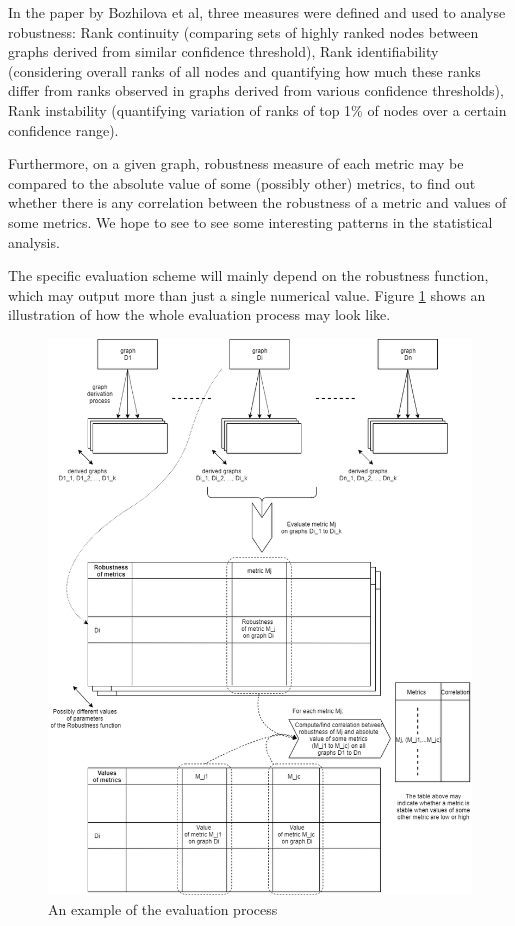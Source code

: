 \documentclass[12pt,a4paper,twoside]{article}
\begin{document}
    	In the paper by Bozhilova et al, three measures were defined and used to analyse robustness: Rank continuity (comparing sets of highly ranked nodes between graphs derived from similar confidence threshold), Rank identifiability (considering overall ranks of all nodes and quantifying how much these ranks differ from ranks observed in graphs derived from various confidence thresholds), Rank instability (quantifying variation of ranks of top 1\% of nodes over a certain confidence range). 
    	
    	Furthermore, on a given graph, robustness measure of each metric may be compared to the absolute value of some (possibly other) metrics, to find out whether there is any correlation between the robustness of a metric and values of some metrics. We hope to see to see some interesting patterns in the statistical analysis.
    	
    	The specific evaluation scheme will mainly depend on the robustness function, which may output more than just a single numerical value. Figure \ref{fig:example_eval} shows an illustration of how the whole evaluation process may look like.
    	
        	\begin{figure}[p!]
        	\centering
            \includegraphics[width=16cm]{images/proposal_diagram1.png}
            \caption{An example of the evaluation process}
            \label{fig:example_eval}
            \end{figure}
	
\end{document}

